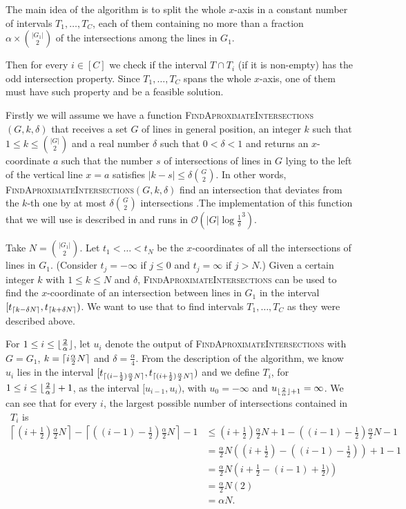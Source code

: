 \documentclass{article}
\DeclarePairedDelimiter\ceil{\lceil}{\rceil}
\DeclarePairedDelimiter\floor{\lfloor}{\rfloor}
\def\bigo{\mathcal{O}}
\begin{document}
The main idea of the algorithm is to split the whole $x$-axis in a constant number of intervals $T_1, \dots, T_C$, each of them containing no more than a fraction $\alpha \times {|G_1|\choose 2}$ of the intersections among the lines in $G_1$.

Then for every $i \in [C]$ we check if the interval $T \cap T_i$ (if it is non-empty) has the odd intersection property. Since $T_1, \dots, T_C$ spans the whole $x$-axis, one of them must have such property and be a feasible solution.

Firstly we will assume we have a function \textsc{FindAproximateIntersections}$(G,k,\delta)$ that receives a set $G$ of lines in general position, an integer $k$ such that $1 \leq k \leq {|G|\choose 2}$ and a real number $\delta$ such that $0 < \delta < 1$ and returns an $x$-coordinate $a$ such that the number $s$ of intersections of lines in $G$ lying to the left of the vertical line $x=a$ satisfies $|k-s|\leq \delta {G \choose 2}$. In other words, \textsc{FindAproximateIntersections}$(G,k,\delta)$ find an intersection that deviates from the $k$-th one by at most $ \delta {G \choose 2}$ intersections .The implementation of this function that we will use is described in \cite{epsnets} and runs in $\bigo(|G| \log \frac{1}{\delta}^3)$.

Take $N = {|G_1| \choose 2}$. Let $t_1<\dots < t_{N}$ be the $x$-coordinates of all the intersections of lines in $G_1$.
(Consider $t_j = -\infty$ if $j \leq 0$ and $t_j = \infty$ if $j>N$.) Given a certain integer $k$ with $1 \leq k \leq N$ and $\delta$, \textsc{FindAproximateIntersections} can be used to find the $x$-coordinate of an intersection between lines in $G_1$ in the interval $[t_{\ceil{k-\delta{N}}},t_{\ceil{k+\delta{N}}})$. We want to use that to find intervals $T_1, \dots, T_C$ as they were described above.

For $1\leq i \leq \floor{\frac{2}{\alpha}}$, let $u_i$ denote the output of \textsc{FindAproximateIntersections} with $G=G_1$, $k=\ceil{i \frac{\alpha}{2} N}$ and $\delta=\frac{\alpha}{4}$.  From the description of the algorithm, we know $u_i$ lies in the interval $[t_{\ceil{(i-\frac{1}{2}) \frac{\alpha}{2}{N}}},t_{\ceil{(i+\frac{1}{2}) \frac{\alpha}{2}{N}}})$ and we define $T_i$, for $1\leq i \leq \floor{\frac{2}{\alpha}} +1$,  as the interval $[u_{i-1},u_i)$, with $u_0 = -\infty$ and $u_{\floor{\frac{2}{\alpha}}+1}=\infty$. We can see that for every $i$, the largest possible number of intersections contained in
~$T_i$ is
\begin{align*}
\left\lceil\left(i+\frac{1}{2}\right) \frac{\alpha}{2}{N}\right\rceil-\left\lceil\left((i-1)-\frac{1}{2}\right)\frac{\alpha}{2}{N}\right\rceil -1 & \leq 
\left(i+\frac{1}{2}\right) \frac{\alpha}{2}{N}+1-\left((i-1)-\frac{1}{2}\right)\frac{\alpha}{2}{N} - 1\\
 & =\frac{\alpha}{2}{N} \left(\left(i+\frac{1}{2}\right)-\left((i-1)-\frac{1}{2}\right)\right) +1 -1\\
 & = \frac{\alpha}{2}{N} \left(i+\frac{1}{2}-(i-1)+\frac{1}{2})\right)  \\
 & = \frac{\alpha}{2}{N} \left(2\right) \\
 & = \alpha{N}.
\end{align*}
\end{document}
